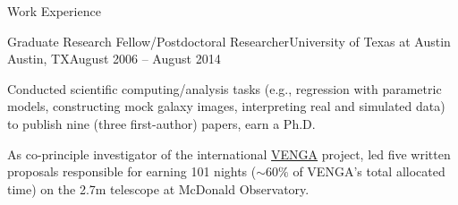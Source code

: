 \documentclass{article}
\newlength{\tabin}
\newlength{\secsep}
\newcommand{\lineunder}{\vspace*{-8pt} \\ \hspace*{-6pt} \hrulefill \\ \vspace*{-15pt}}
\newenvironment{tabbedsection}[1]{
  \begin{list}{}{
      \setlength{\itemsep}{0pt}
      \setlength{\labelsep}{0pt}
      \setlength{\labelwidth}{0pt}
      \setlength{\leftmargin}{\tabin}
      \setlength{\rightmargin}{\tabin}
      \setlength{\listparindent}{0pt}
      \setlength{\parsep}{0pt}
      \setlength{\parskip}{0pt}
      \setlength{\partopsep}{0pt}
      \setlength{\topsep}{#1}
    }
  \item[]
}{\end{list}}
\newenvironment{resume_section}[1]{
  \filbreak
  \vspace{2\secsep}
  \textsc{\large#1}
  \lineunder
  \begin{tabbedsection}{\secsep}
}{\end{tabbedsection}}
\newenvironment{subitems}{
  \renewcommand{\labelitemi}{-}
  \begin{itemize}
      \setlength{\labelsep}{1em}
}{\end{itemize}}
\newenvironment{resume_employer}[4]{
  \vspace{\secsep}
  \textbf{#1} \\ 
  \indent {\small #2} \hfill {\footnotesize#3 (#4)}
  \begin{tabbedsection}{0pt}
  \begin{subitems}
}{\end{subitems}\end{tabbedsection}}
\begin{document}
\begin{resume_section}{Work Experience}
  \begin{resume_employer}{Graduate Research Fellow/Postdoctoral Researcher}{University of Texas at Austin}
  {Austin, TX}{August 2006 -- August 2014}
    \item Conducted scientific computing/analysis tasks (e.g., regression with parametric models, constructing mock galaxy images, interpreting real and simulated data) to publish nine (three first-author) papers, earn a Ph.D. 
    \item As co-principle investigator of the international 
\href{https://users.obs.carnegiescience.edu/gblancm/venga.html}{VENGA}
project, led five written proposals responsible for earning 101 nights ($\sim60\%$ of VENGA's total allocated time) on
    the 2.7m telescope at McDonald Observatory.
  \end{resume_employer}



\end{resume_section}

\iffalse %
\begin{resume_section}{Personal Data Science Projects}
\begin{subitems}

\item Created a \href{http://loveofdatascience.blogspot.com/}{blog} to highlight self-guided data science projects
involving machine learning (e.g., 
\href{http://loveofdatascience.blogspot.co.uk/2014/01/gender-classification-with-machine.html}{gender classification}, 
\href{http://loveofdatascience.blogspot.co.uk/2016/07/naive-bayes-text-classification-of.html}{document classification}), 
text mining (e.g., \href{http://loveofdatascience.blogspot.co.uk/2016/05/how-to-save-earth-with-word-association.html}{word associations and topic modeling}), 
\href{http://loveofdatascience.blogspot.co.uk/2014/09/web-crawling-for-job-postings.html}{web scraping},
\href{http://loveofdatascience.blogspot.co.uk/2015/12/does-congressional-approval-rating-vary.html}{hypothesis testing}, and data visualization (e.g., 
\href{http://loveofdatascience.blogspot.co.uk/2016/09/graph-analysis-of-leaked-democratic.html}{network maps with an R Shiny web application}). 

        \end{subitems}
\end{resume_section}
\fi
\end{document}

